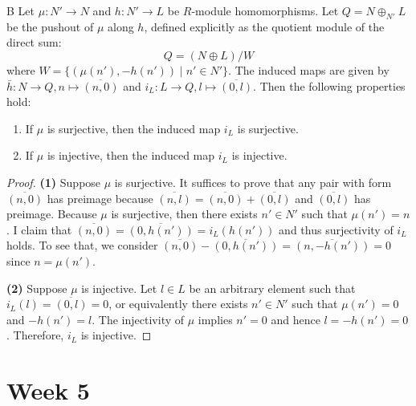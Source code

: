 \begin{lemma}{B}
Let $\mu: N' \to N$ and $h: N' \to L$ be $R$-module homomorphisms. Let $Q = N \oplus_{N'} L$ be the pushout of $\mu$ along $h$, defined explicitly as the quotient module of the direct sum:
\[ Q = (N \oplus L) / W \]
where $W = \{(\mu(n'), -h(n')) \mid n' \in N'\}$. The induced maps are given by $\bar{h}: N \to Q, n \mapsto \overline{(n, 0)}$ and $i_L: L \to Q, l \mapsto \overline{(0, l)}$. Then the following properties hold:
\begin{enumerate}
    \item If $\mu$ is surjective, then the induced map $i_L$ is surjective.
    \item If $\mu$ is injective, then the induced map $i_L$ is injective.
\end{enumerate}
\end{lemma}
\begin{proof}
\textbf{(1)} Suppose $\mu$ is surjective. It suffices to prove that any pair with form $\overline{(n,0)}$ has preimage because $\overline{(n,l)} = \overline{(n,0)}+\overline{(0,l)}$ and $\overline{(0,l)}$ has preimage.
Because $\mu$ is surjective, then there exists $n'\in N'$ such that $\mu(n')=n$. I claim that $\overline{(n,0)} = \overline{(0,h(n'))}= i_L(h(n'))$ and thus surjectivity of $i_L$ holds.
To see that, we consider $\overline{(n,0)}-\overline{(0,h(n'))} = \overline{(n,-h(n'))}=0$ since $n=\mu(n')$.

\textbf{(2)} Suppose $\mu$ is injective. Let $l\in L$ be an arbitrary element such that $i_L(l)= \overline{(0,l)}=0$, or equivalently there exists $n'\in N'$ such that $\mu(n')=0$ and $-h(n')=l$.
The injectivity of $\mu$ implies $n'=0$ and hence $l=-h(n')=0$. Therefore, $i_L$ is injective.
\end{proof}
\section{Week 5}
